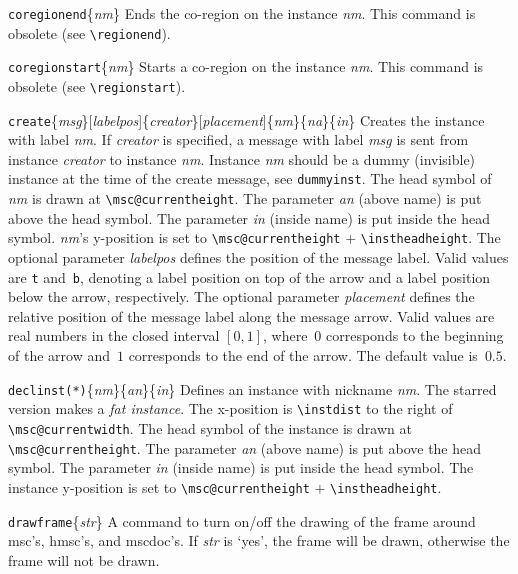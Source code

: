 \documentclass[a4paper]{article}
\newcommand{\cmd}[1]{\texttt{\bslash #1}}
\newcommand{\opt}[1]{[#1]}
\newenvironment{defs}{%
  \begin{list}{}%
              {\setlength{\labelwidth}{0pt}%
               \setlength{\labelsep}{1em}%
               \setlength{\leftmargin}{1em}%
               \setlength{\parsep}{1ex}%
               \setlength{\listparindent}{0pt}%
               \setlength{\rightmargin}{0pt}%
               \renewcommand{\makelabel}[1]{##1}%
               \raggedright%
              }%
  }{%
  \end{list}}
\begin{document}
\begin{defs}
\item[\cmd{coregionend}\{\emph{nm}\}] Ends the co-region on the instance
\emph{nm}. This command is obsolete (see \verb|\regionend|).

\item[\cmd{coregionstart}\{\emph{nm}\}] Starts a co-region on the instance
\emph{nm}. This command is obsolete (see \verb|\regionstart|).

\item[\cmd{create}\{\emph{msg}\}\opt{\emph{labelpos}}\{\emph{creator}\}\opt{\emph{placement}}\{\emph{nm}\}\{\emph{na}\}\{\emph{in}\}]
Creates the instance with label \emph{nm}. If \emph{creator} is
specified, a message with label \emph{msg} is sent from instance
\emph{creator} to instance \emph{nm}. Instance \emph{nm} should be a 
dummy (invisible) instance at the time of the create message, see
\cmd{dummyinst}. The head symbol of \emph{nm} is drawn at
\verb|\msc@currentheight|. The parameter \emph{an} (above name) is put
above the head symbol. The parameter \emph{in} (inside name) is put
inside the head symbol. \emph{nm}'s y-position is set to
\verb|\msc@currentheight| $+$ \verb|\instheadheight|.  The optional
parameter \emph{labelpos} defines the position of the message label. Valid
values are \verb|t| and~\verb|b|, denoting a label position on top of
the arrow and a label position below the arrow, respectively.  The
optional parameter \emph{placement} defines the relative position of
the message label along the message arrow. Valid values are real
numbers in the closed interval $[0,1]$, where~$0$ corresponds to the
beginning of the arrow and~$1$ corresponds to the end of the
arrow. The default value is~$0.5$.

\item[\cmd{declinst(*)}\{\emph{nm}\}\{\emph{an}\}\{\emph{in}\}]
Defines an instance with nickname \emph{nm}.  The starred version
makes a \emph{fat instance}. The x-position is \verb|\instdist| to the
right of \verb|\msc@currentwidth|. The head symbol of the instance is
drawn at \verb|\msc@currentheight|. The parameter \emph{an} (above
name) is put above the head symbol. The parameter \emph{in} (inside
name) is put inside the head symbol. The
instance y-position is set to \verb|\msc@currentheight| $+$ \verb|\instheadheight|.


\item[\cmd{drawframe}\{\emph{str}\}] A command to turn on/off the
drawing of the frame around msc's, hmsc's, and mscdoc's. If \emph{str}
is `yes', the frame will be drawn, otherwise the frame will not be
drawn.


\end{defs}
\end{document}

